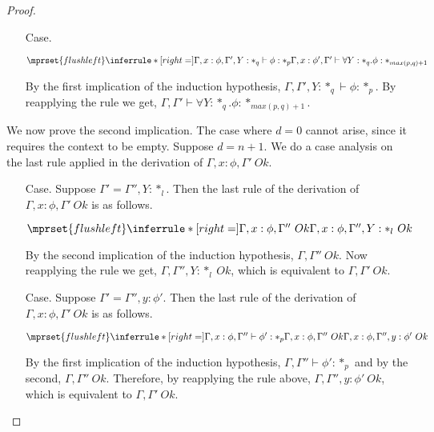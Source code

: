\begin{proof}
\begin{itemize}
  \item[Case.]\ \\
    \begin{center}
      \begin{math}
        $$\mprset{flushleft}
        \inferrule* [right=] {
          \Gamma,x:\phi,\Gamma',Y:*_q \vdash \phi : *_p
        }{\Gamma,x:\phi',\Gamma' \vdash \forall Y:*_q.\phi : *_{max(p,q)+1}}
      \end{math}
    \end{center}
    By the first implication of the induction hypothesis, $\Gamma,\Gamma',Y:*_q \vdash \phi:*_p$.
    By reapplying the rule we get, $\Gamma,\Gamma' \vdash \forall Y:*_q.\phi:*_{max(p,q)+1}$.
  \end{itemize}

  \noindent We now prove the second implication.
  The case where $d = 0$ cannot arise, since it requires the context to be empty.
  Suppose $d = n + 1$.  We do a case analysis on the last rule applied in the derivation of
  $\Gamma,x:\phi,\Gamma'\ Ok$.
  \begin{itemize}
  \item[Case.]  Suppose $\Gamma' = \Gamma'',Y:*_l$.  Then the last rule of the derivation of
    $\Gamma,x:\phi,\Gamma'\ Ok$ is as follows.
    \begin{center}
      \begin{math}
        $$\mprset{flushleft}
        \inferrule* [right=] {
          \Gamma,x:\phi,\Gamma''\ Ok
        }{\Gamma,x:\phi,\Gamma'',Y:*_l\ Ok}
      \end{math}
    \end{center}
    By the second implication of the induction hypothesis, $\Gamma,\Gamma''\ Ok$.  Now 
    reapplying the rule we get, $\Gamma,\Gamma'',Y:*_l\ Ok$, which is equivalent to 
    $\Gamma,\Gamma'\ Ok$.
    
  \item[Case.]  Suppose $\Gamma' = \Gamma'',y:\phi'$.  Then the last rule of the derivation of
    $\Gamma,x:\phi,\Gamma'\ Ok$ is as follows.
    \begin{center}
      \begin{math}
        $$\mprset{flushleft}
        \inferrule* [right=] {
          \Gamma,x:\phi,\Gamma'' \vdash \phi':*_p
          \\
          \Gamma,x:\phi,\Gamma''\ Ok
        }{\Gamma,x:\phi,\Gamma'',y :\phi'\ Ok}
      \end{math} 
    \end{center}
    By the first implication of the induction hypothesis, $\Gamma,\Gamma'' \vdash \phi':*_p$ and 
    by the second, $\Gamma,\Gamma''\ Ok$.
    Therefore, by reapplying the rule above, $\Gamma,\Gamma'',y:\phi'\ Ok$, which is equivalent 
    to $\Gamma,\Gamma'\ Ok$.
  \end{itemize}
\end{proof}

